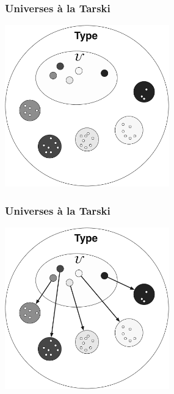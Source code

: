 \documentclass[tikz, 12pt]{beamer}
\begin{document}
\begin{frame}
  \frametitle{Universes \`a la Tarski}
  \begin{center}
    \includegraphics[width=2.8in]{universe-populated.pdf}
  \end{center}
\end{frame}

\begin{frame}
  \frametitle{Universes \`a la Tarski}
  \begin{center}
    \includegraphics[width=2.8in]{universe-interpretation.pdf}
  \end{center}
\end{frame}
\end{document}
